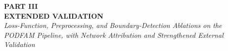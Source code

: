 \documentclass[12pt,a4paper,oneside]{report}
\begin{document}








\clearpage
\begin{center}
{\large\bfseries PART III}\\[4pt]
{\Huge\bfseries EXTENDED VALIDATION}\\[8pt]
{\large\itshape Loss-Function, Preprocessing, and Boundary-Detection Ablations on the\\
PODFAM Pipeline, with Network Attribution and Strengthened External Validation}
\end{center}
\clearpage






\end{document}

